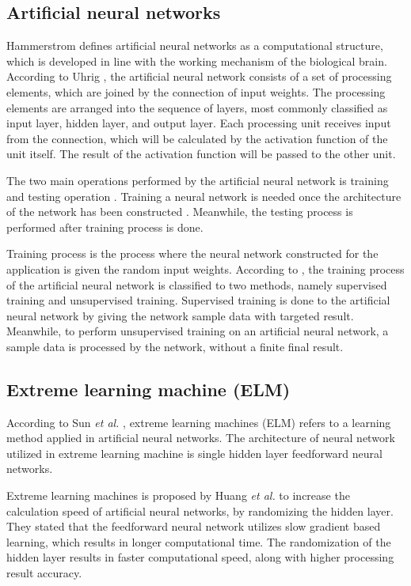 \documentclass[journal,comsoc]{IEEEtran}
\begin{document}
\subsection{Artificial neural networks}

Hammerstrom \cite{Hammerstrom93} defines artificial neural networks as a computational structure, which is developed in line with the working mechanism of the biological brain. According to Uhrig \cite{Uhrig95}, the artificial neural network consists of a set of processing elements, which are joined by the connection of input weights. The processing elements are arranged into the sequence of layers, most commonly classified as input layer, hidden layer, and output layer. Each processing unit receives input from the connection, which will be calculated by the activation function of the unit itself. The result of the activation function will be passed to the other unit.

The two main operations performed by the artificial neural network is training and testing operation \cite{Uhrig95}. Training a neural network is needed once the architecture of the network has been constructed \cite{Reingnold16}. Meanwhile, the testing process is performed after training process is done.

Training process is the process where the neural network constructed for the application is given the random input weights. According to \cite{Heeswijk15}, the training process of the artificial neural network is classified to two methods, namely supervised training and unsupervised training. Supervised training is done to the artificial neural network by giving the network sample data with targeted result. Meanwhile, to perform unsupervised training on an artificial neural network, a sample data is processed by the network, without a finite final result.

\subsection{Extreme learning machine (ELM)}

According to Sun \textit{et al.} \cite{Gao14}, extreme learning machines (ELM) refers to a learning method applied in artificial neural networks. The architecture of neural network utilized in extreme learning machine is single hidden layer feedforward neural networks.

Extreme learning machines is proposed by Huang \textit{et al.} \cite{Huang06} to increase the calculation speed of artificial neural networks, by randomizing the hidden layer. They stated that the feedforward neural network utilizes slow gradient based learning, which results in longer computational time. The randomization of the hidden layer results in faster computational speed, along with higher processing result accuracy.
\end{document}
